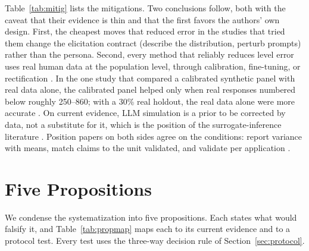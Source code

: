 \documentclass[11pt]{article}
\begin{document}
Table~\ref{tab:mitig} lists the mitigations. Two conclusions follow, both with the caveat that their evidence is thin and that the first favors the authors' own design. First, the cheapest moves that reduced error in the studies that tried them change the elicitation contract (describe the distribution, perturb prompts) rather than the persona. Second, every method that reliably reduces level error uses real human data at the population level, through calibration, fine-tuning, or rectification \citep{kambhatla2025,suh2025subpop,krsteski2025}. In the one study that compared a calibrated synthetic panel with real data alone, the calibrated panel helped only when real responses numbered below roughly 250--860; with a 30\% real holdout, the real data alone were more accurate \citep{kim2026korean}. On current evidence, LLM simulation is a prior to be corrected by data, not a substitute for it, which is the position of the surrogate-inference literature \citep{angelopoulos2023,egami2023,broska2024,ludwig2024}. Position papers on both sides agree on the conditions: report variance with means, match claims to the unit validated, and validate per application \citep{wu2025boundary,anthis2025,schroder2025,lin2025}.

\section{Five Propositions}
\label{sec:props}

We condense the systematization into five propositions. Each states what would falsify it, and Table~\ref{tab:propmap} maps each to its current evidence and to a protocol test. Every test uses the three-way decision rule of Section~\ref{sec:protocol}.
\end{document}
